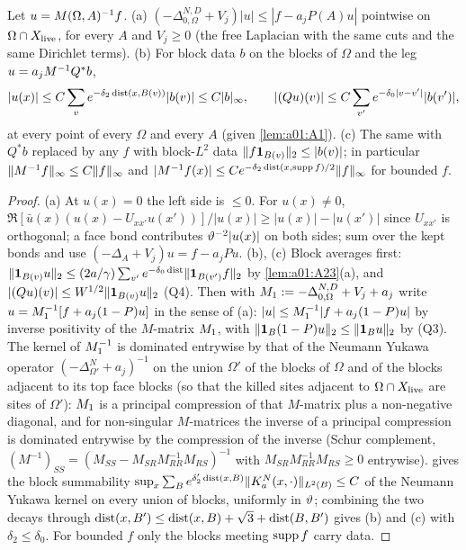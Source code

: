 \begin{lemma}\label{lem:a01:A4}
Let $u=M(\Omega,A)^{-1}f$. (a) $(-\Delta^{N,D}_{0,\Omega}+V_j)|u|\le|f-a_jP(A)u|$ pointwise on $\Omega\cap X_{\mathrm{live}}$, for every $A$ and $V_j\ge0$ (the free Laplacian with the same cuts and the same Dirichlet terms). (b) For block data $b$ on the blocks of $\Omega$ and the leg $u=a_jM^{-1}Q^*b$,
\[
|u(x)|\le C\sum_{v}e^{-\delta_2\operatorname{dist}(x,B(v))}|b(v)|\le C|b|_\infty,\qquad |(Qu)(v)|\le C\sum_{v'}e^{-\delta_0|v-v'|}|b(v')|,
\]
at every point of every $\Omega$ and every $A$ (given \cref{lem:a01:A1}). (c) The same with $Q^*b$ replaced by any $f$ with block-$L^2$ data $\lVert f\mathbf 1_{B(v)}\rVert_2\le|b(v)|$; in particular $\lVert M^{-1}f\rVert_\infty\le C\lVert f\rVert_\infty$ and $|M^{-1}f(x)|\le Ce^{-\delta_2\operatorname{dist}(x,\operatorname{supp} f)/2}\lVert f\rVert_\infty$ for bounded $f$.
\end{lemma}
\begin{proof}
(a) At $u(x)=0$ the left side is $\le0$. For $u(x)\ne0$, $\Re[\bar u(x)(u(x)-U_{xx'}u(x'))]/|u(x)|\ge|u(x)|-|u(x')|$ since $U_{xx'}$ is orthogonal; a face bond contributes $\vartheta^{-2}|u(x)|$ on both sides; sum over the kept bonds and use $(-\Delta_A+V_j)u=f-a_jPu$. (b), (c) Block averages first: $\lVert \mathbf 1_{B(v)}u\rVert_2\le(2a/\gamma)\sum_{v'}e^{-\delta_0\operatorname{dist}}\lVert \mathbf 1_{B(v')}f\rVert_2$ by \cref{lem:a01:A23}(a), and $|(Qu)(v)|\le W^{1/2}\lVert \mathbf 1_{B(v)}u\rVert_2$ (Q4). Then with $M_1:=-\Delta^{N,D}_{0,\Omega}+V_j+a_j$ write $u=M_1^{-1}[f+a_j(1-P)u]$ in the sense of (a): $|u|\le M_1^{-1}|f+a_j(1-P)u|$ by inverse positivity of the $M$-matrix $M_1$, with $\lVert \mathbf 1_B(1-P)u\rVert_2\le\lVert \mathbf 1_Bu\rVert_2$ by (Q3). The kernel of $M_1^{-1}$ is dominated entrywise by that of the Neumann Yukawa operator $(-\Delta^N_{\Omega'}+a_j)^{-1}$ on the union $\Omega'$ of the blocks of $\Omega$ and of the blocks adjacent to its top face blocks (so that the killed sites adjacent to $\Omega\cap X_{\mathrm{live}}$ are sites of $\Omega'$): $M_1$ is a principal compression of that $M$-matrix plus a non-negative diagonal, and for non-singular $M$-matrices the inverse of a principal compression is dominated entrywise by the compression of the inverse (Schur complement, $(M^{-1})_{SS}=(M_{SS}-M_{SR}M_{RR}^{-1}M_{RS})^{-1}$ with $M_{SR}M_{RR}^{-1}M_{RS}\ge0$ entrywise).  gives the block summability $\sup_x\sum_Be^{\delta_2'\operatorname{dist}(x,B)}\lVert K^N_a(x,\cdot)\rVert_{L^2(B)}\le C$ of the Neumann Yukawa kernel on every union of blocks, uniformly in $\vartheta$; combining the two decays through $\operatorname{dist}(x,B')\le\operatorname{dist}(x,B)+\sqrt3+\operatorname{dist}(B,B')$ gives (b) and (c) with $\delta_2\le\delta_0$. For bounded $f$ only the blocks meeting $\operatorname{supp} f$ carry data.
\end{proof}

